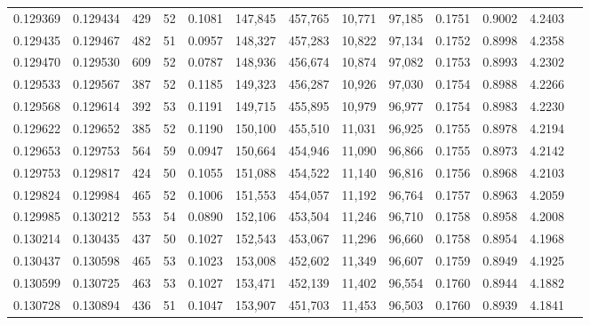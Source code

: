 \begin{tabular}{rrrrrrrrrrrrr}
0.129369 & 0.129434 &   429 &  52 &                                     0.1081 & 147,845 & 457,765 &  10,771 &  97,185 & 0.1751 & 0.9002 & 4.2403 \\
0.129435 & 0.129467 &   482 &  51 &                                     0.0957 & 148,327 & 457,283 &  10,822 &  97,134 & 0.1752 & 0.8998 & 4.2358 \\
0.129470 & 0.129530 &   609 &  52 &                                     0.0787 & 148,936 & 456,674 &  10,874 &  97,082 & 0.1753 & 0.8993 & 4.2302 \\
0.129533 & 0.129567 &   387 &  52 &                                     0.1185 & 149,323 & 456,287 &  10,926 &  97,030 & 0.1754 & 0.8988 & 4.2266 \\
0.129568 & 0.129614 &   392 &  53 &                                     0.1191 & 149,715 & 455,895 &  10,979 &  96,977 & 0.1754 & 0.8983 & 4.2230 \\
0.129622 & 0.129652 &   385 &  52 &                                     0.1190 & 150,100 & 455,510 &  11,031 &  96,925 & 0.1755 & 0.8978 & 4.2194 \\
0.129653 & 0.129753 &   564 &  59 &                                     0.0947 & 150,664 & 454,946 &  11,090 &  96,866 & 0.1755 & 0.8973 & 4.2142 \\
0.129753 & 0.129817 &   424 &  50 &                                     0.1055 & 151,088 & 454,522 &  11,140 &  96,816 & 0.1756 & 0.8968 & 4.2103 \\
0.129824 & 0.129984 &   465 &  52 &                                     0.1006 & 151,553 & 454,057 &  11,192 &  96,764 & 0.1757 & 0.8963 & 4.2059 \\
0.129985 & 0.130212 &   553 &  54 &                                     0.0890 & 152,106 & 453,504 &  11,246 &  96,710 & 0.1758 & 0.8958 & 4.2008 \\
0.130214 & 0.130435 &   437 &  50 &                                     0.1027 & 152,543 & 453,067 &  11,296 &  96,660 & 0.1758 & 0.8954 & 4.1968 \\
0.130437 & 0.130598 &   465 &  53 &                                     0.1023 & 153,008 & 452,602 &  11,349 &  96,607 & 0.1759 & 0.8949 & 4.1925 \\
0.130599 & 0.130725 &   463 &  53 &                                     0.1027 & 153,471 & 452,139 &  11,402 &  96,554 & 0.1760 & 0.8944 & 4.1882 \\
0.130728 & 0.130894 &   436 &  51 &                                     0.1047 & 153,907 & 451,703 &  11,453 &  96,503 & 0.1760 & 0.8939 & 4.1841 \\

\end{tabular}
